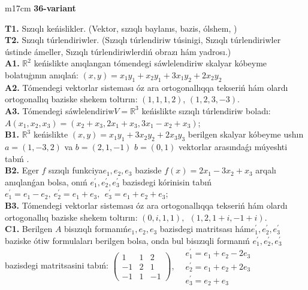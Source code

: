 \documentclass{article}
\begin{document}
\begin{tabular}{m{17cm}}
\textbf{36-variant}
\newline

\textbf{T1.} Sızıqlı keńislikler.   (Vektor,  sızıqlı baylanıs, bazis, ólshem, )  \\
\textbf{T2.} Sızıqlı túrlendiriwler.  (Sızıqlı túrlendiriw túsinigi, Sızıqlı túrlendiriwler ústinde ámeller, Sızıqlı túrlendiriwlerdiń obrazı hám yadrosı.) \\
\textbf{A1.} \(\mathbb{R}^{2}\) keńislikte anıqlangan tómendegi sáwlelendiriw skalyar kóbeyme bolatuģının anıqlań: \((x,y) = x_{1}y_{1} + x_{2}y_{1} + 3x_{1}y_{2} + 2x_{2}y_{2}\) \\
\textbf{A2.} Tómendegi vektorlar sisteması óz ara ortogonallıqqa tekseriń hám olardı ortogonallıq baziske shekem toltırın: \((1,1,1,2)\), \((1,2,3, - 3)\). \\
\textbf{A3.} Tómendegi sáwlelendiriw\(V = \mathbb{R}^{3}\) keńislikte sızıqlı túrlendiriw boladı: \(A\left( x_{1},x_{2},x_{3} \right) = \left( x_{2} + x_{3},2x_{1} + x_{3},3x_{1} - x_{2} + x_{3} \right)\); \\
\textbf{B1.} \(\mathbb{R}^{3}\) keńislikte \((x,y) = x_{1}y_{1} + 3x_{2}y_{2} + 2x_{3}y_{3}\) berilgen skalyar kóbeyme ushın \(a = (1, - 3,2)\) va \(b = (2,1, - 1)\) \(b = (0,1)\) vektorlar arasındaǵı múyeshti tabıń . \\
\textbf{B2.} Eger \(f\) sızıqlı funkciya\(e_{1},e_{2},e_{3}\) bazisde \(f(x) = 2x_{1} - 3x_{2} + x_{3}\) arqalı anıqlanǵan bolsa, onıń \(e_{1}^{'},e_{2}^{'},e_{3}^{'}\) bazisdegi kórinisin tabıń\(e_{1}^{'} = e_{1} - e_{2},\ e_{2}^{'} = e_{1} + e_{3},\ \ e_{3}^{'} = e_{1} + e_{2} + e_{3}\); \\
\textbf{B3.} Tómendegi vektorlar sisteması óz ara ortogonallıqqa tekseriń hám olardı ortogonallıq baziske shekem toltırın: \((0,i,1,1),\ \ (1,2,1 + i, - 1 + i)\). \\
\textbf{C1.} Berilgen \(A\) bisızıqlı formanıń\(e_{1},e_{2},e_{3}\) bazisdegi matritsası hám\(e_{1}^{'},e_{2}^{'},e_{3}^{'}\) baziske ótiw formulaları berilgen bolsa, onda bul bisızıqli formanıń \(e_{1}^{'},e_{2}^{'},e_{3}^{'}\) bazisdegi matritsasini tabıń: \(\begin{pmatrix} 1 & 1 & 2 \\  - 1 & 2 & 1 \\  - 1 & 1 & - 1 \end{pmatrix},\begin{matrix}  & e_{1}^{'} = e_{1} + e_{2} - 2e_{3} \\  & e_{2}^{'} = e_{1} + e_{2} + 2e_{3} \\  & e_{3}^{'} = e_{2} + e_{3} \end{matrix}\) \\

\end{tabular}
\end{document}
